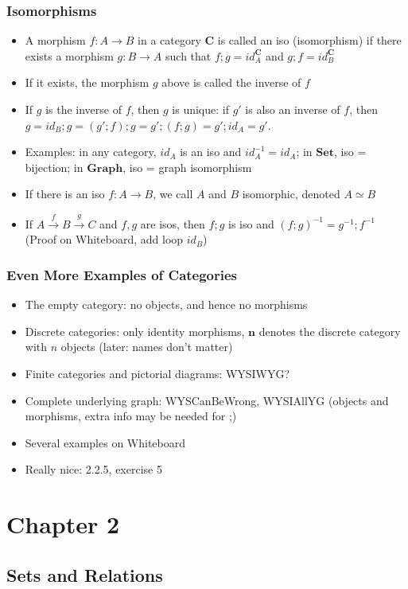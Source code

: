 \documentclass[handout]{beamer}
\newcommand{\bfsf}[1]{{\boldsymbol{#1}}}
\newcommand{\Set}{\bfsf{Set}}
\newcommand{\Gra}{\bfsf{Graph}}
\newcommand{\CC}{\bfsf{C}}
\begin{document}
\frame
  {   
    \frametitle{Isomorphisms}\label{Ch2:Isos}

 \begin{itemize}[<+->]
\item A morphism $f : A\to B$ in a category $\CC$ is called an iso (isomorphism)
if there exists a morphism $g : B\to A$ such that $f;g = id^\CC_A$ and
$g;f = id^\CC_B$
\item If it exists, the morphism $g$ above is called the inverse of $f$
\item If $g$ is the inverse of $f$, then $g$ is unique: if $g'$ is also
an inverse of $f$, then $g = id_B;g = (g';f);g = g';(f;g) = g';id_A = g'$.
\item Examples: in any category, $id_A$ is an iso and $id_A^{-1} = id_A$;
in $\Set$, iso = bijection; in $\Gra$, iso = graph isomorphism
\item If there is an iso $f: A\to B$, we call $A$ and $B$ isomorphic, 
denoted $A\simeq B$
\item If  $A \stackrel{f}{\to} B \stackrel{g}{\to} C$ and $f,g$ are isos, then
$f;g$ is iso and $(f;g)^{-1} = g^{-1}; f^{-1}$
(Proof on Whiteboard, add loop $id_B$)
 \end{itemize}

 }

\frame
  {   
    \frametitle{Even More Examples of Categories}\label{Ch2:evenMoreExaCat}

 \begin{itemize}[<+->]
\item The empty category: no objects, and hence no morphisms
\item Discrete categories: only identity morphisms, $\bfsf{n}$ denotes
the discrete category with $n$ objects (later: names don't matter)
\item Finite categories and pictorial diagrams: WYSIWYG?
\item Complete underlying graph: WYSCanBeWrong, WYSIAllYG (objects and morphisms,
extra info may be needed for ;)
\item Several examples on Whiteboard
\item Really nice: 2.2.5, exercise 5
 \end{itemize}

 }

\section{Chapter 2}
\subsection{Sets and Relations}
\end{document}
